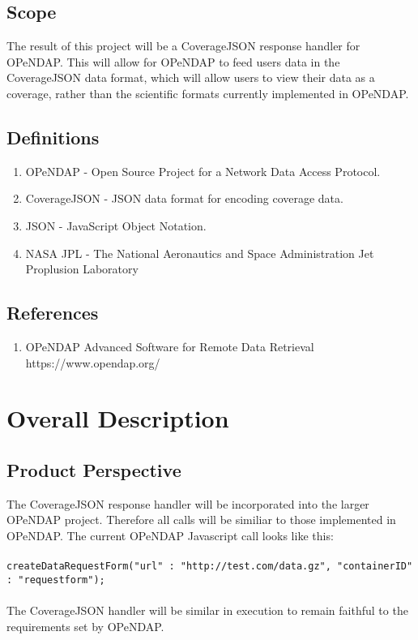 \documentclass[onecolumn, draftclsnofoot,10pt, compsoc]{IEEEtran}
\begin{document}
\subsection{Scope}
The result of this project will be a CoverageJSON response handler for OPeNDAP.
This will allow for OPeNDAP to feed users data in the CoverageJSON data format, which will allow users to view their data as a coverage, rather than the scientific formats currently implemented in OPeNDAP.

\subsection{Definitions}
\begin{enumerate}
\item OPeNDAP - Open Source Project for a Network Data Access Protocol.
\item CoverageJSON - JSON data format for encoding coverage data.
\item JSON - JavaScript Object Notation.
\item NASA JPL - The National Aeronautics and Space Administration Jet Proplusion Laboratory
\end{enumerate}

\subsection{References}
\begin{enumerate}
\item OPeNDAP Advanced Software for Remote Data Retrieval https://www.opendap.org/
\end{enumerate}


\section{Overall Description}
\subsection{Product Perspective}
The CoverageJSON response handler will be incorporated into the larger OPeNDAP project. Therefore all calls will be similiar to those implemented in OPeNDAP. The current OPeNDAP Javascript call looks like this: 
\\\\
\texttt{createDataRequestForm({"url" : "http://test.com/data.gz", "containerID" : "requestform"});}
\\\\The CoverageJSON handler will be similar in execution to remain faithful to the requirements set by OPeNDAP. 
\end{document}
